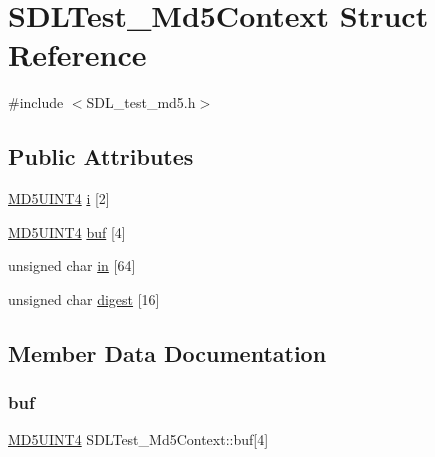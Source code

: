 \hypertarget{struct_s_d_l_test___md5_context}{}\section{S\+D\+L\+Test\+\_\+\+Md5\+Context Struct Reference}
\label{struct_s_d_l_test___md5_context}


{\ttfamily \#include $<$S\+D\+L\+\_\+test\+\_\+md5.\+h$>$}

\subsection*{Public Attributes}
\begin{DoxyCompactItemize}
\item 
\mbox{\hyperlink{_s_d_l__test__md5_8h_a2bdcfd1b3373be8191c70eb4a7cb84c6}{M\+D5\+U\+I\+N\+T4}} \mbox{\hyperlink{struct_s_d_l_test___md5_context_a95b3d5fd74fd1b7a27bf96f3bb32beb4}{i}} \mbox{[}2\mbox{]}
\item 
\mbox{\hyperlink{_s_d_l__test__md5_8h_a2bdcfd1b3373be8191c70eb4a7cb84c6}{M\+D5\+U\+I\+N\+T4}} \mbox{\hyperlink{struct_s_d_l_test___md5_context_a061f0cead7ec49ac4c5baf0bbd9c13a7}{buf}} \mbox{[}4\mbox{]}
\item 
unsigned char \mbox{\hyperlink{struct_s_d_l_test___md5_context_a337638ef799dc0ad9397ea9b175ea388}{in}} \mbox{[}64\mbox{]}
\item 
unsigned char \mbox{\hyperlink{struct_s_d_l_test___md5_context_ab29079997a9f35e5d52c2aac3ad28f90}{digest}} \mbox{[}16\mbox{]}
\end{DoxyCompactItemize}


\subsection{Member Data Documentation}
\mbox{\label{struct_s_d_l_test___md5_context_a061f0cead7ec49ac4c5baf0bbd9c13a7}} 
\subsubsection{\texorpdfstring{buf}{buf}}
{\footnotesize\ttfamily \mbox{\hyperlink{_s_d_l__test__md5_8h_a2bdcfd1b3373be8191c70eb4a7cb84c6}{M\+D5\+U\+I\+N\+T4}} S\+D\+L\+Test\+\_\+\+Md5\+Context\+::buf\mbox{[}4\mbox{]}}

